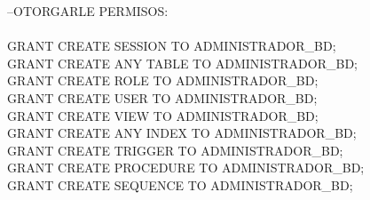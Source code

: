 \documentclass[12pt,letterpaper]{article}
\begin{document}
	--OTORGARLE PERMISOS: \\ 
\\  
	GRANT CREATE SESSION TO ADMINISTRADOR\_BD;\\ 
	GRANT CREATE ANY TABLE TO ADMINISTRADOR\_BD;\\ 
	GRANT CREATE ROLE TO ADMINISTRADOR\_BD;\\ 
	GRANT CREATE USER TO ADMINISTRADOR\_BD;\\ 
	GRANT CREATE VIEW TO ADMINISTRADOR\_BD;\\ 
	GRANT CREATE ANY INDEX TO ADMINISTRADOR\_BD;\\ 
	GRANT CREATE TRIGGER TO ADMINISTRADOR\_BD;\\ 
	GRANT CREATE PROCEDURE TO ADMINISTRADOR\_BD;\\
	GRANT CREATE SEQUENCE TO ADMINISTRADOR\_BD;\\\\ 	
	
\end{document}

